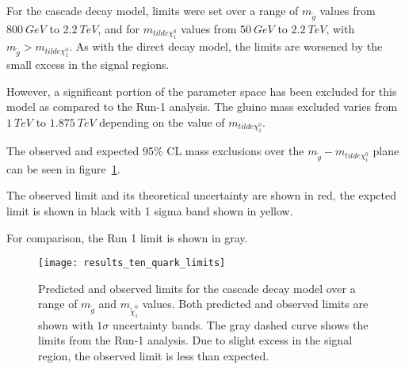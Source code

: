 For the cascade decay model, limits were set over a range of $m_{\tilde{g}}$ values from $800~GeV$ to $2.2~TeV$,
and for $m_{tilde{\chi}_1^0}$ values from $50~GeV$ to $2.2~TeV$, with $m_{\tilde{g}} > m_{tilde{\chi}_1^0}$.
As with the direct decay model, the limits are worsened by the small excess in the signal regions.

However, a significant portion of the parameter space has been excluded for this model as compared to the Run-1 analysis.
The gluino mass excluded varies from $1~TeV$ to $1.875~TeV$ depending on the value of $m_{tilde{\chi}_1^0}$.

The observed and expected 95\% CL mass exclusions over the  $m_{\tilde{g}} - m_{tilde{\chi}_1^0}$ plane can be seen in figure~\ref{fig:results_ten_quark_limits}.

The observed limit and its theoretical uncertainty are shown in red, the expcted limit is shown in black with 1 sigma band
shown in yellow.

For comparison, the Run 1 limit is shown in gray.

\begin{figure}[!ht]
    \centering
    \texttt{[image: results\_ten\_quark\_limits]}
    \caption{Predicted and observed limits for the cascade decay model over a range of $m_{\tilde{g}}$
and $m_{\tilde{\chi}_1^0}$ values.
    Both predicted and observed limits are shown with $1\sigma$ uncertainty bands.
    The gray dashed curve shows the limits from the Run-1 analysis.
    Due to slight excess in the signal region, the observed limit is less than expected.}
\label{fig:results_ten_quark_limits}
\end{figure}

